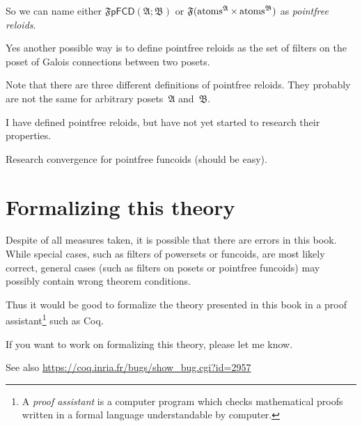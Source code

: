 So we can name either $\mathfrak{F}\mathsf{pFCD}(\mathfrak{A};\mathfrak{B})$
or $\mathfrak{F}(\operatorname{atoms}^{\mathfrak{A}}\times\operatorname{atoms}^{\mathfrak{B}})$
as \emph{pointfree reloids}.

Yes another possible way is to define pointfree reloids as the set of filters on the poset of Galois connections
between two posets.

Note that there are three different definitions of pointfree reloids.
They probably are not the same for arbitrary posets~$\mathfrak{A}$
and~$\mathfrak{B}$.

I have defined pointfree reloids, but have not yet started to research
their properties.

Research convergence for pointfree funcoids (should be easy).


\section{Formalizing this theory}

Despite of all measures taken, it is possible that there are errors
in this book. While special cases, such as filters of powersets or
funcoids, are most likely correct, general cases (such as filters
on posets or pointfree funcoids) may possibly contain wrong theorem
conditions.

Thus it would be good to formalize the theory presented in this book
in a proof assistant\footnote{A \emph{proof assistant} is a computer program which checks mathematical
proofs written in a formal language understandable by computer.} such as Coq.

If you want to work on formalizing this theory, please let me know.

See also \href{https://coq.inria.fr/bugs/show_bug.cgi?id=2957}{https://coq.inria.fr/bugs/show\_{}bug.cgi?id=2957}
